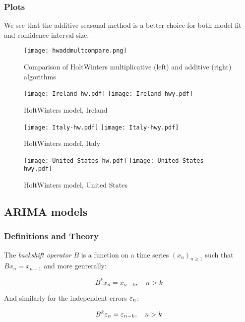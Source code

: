 \subsubsection{Plots}

We see that the additive seasonal method is a better choice for both model fit and confidence interval size.

\begin{figure}[H]
\begin{center}
\texttt{[image: hwaddmultcompare.png]}
\endminipage\hfill
\caption{Comparison of HoltWinters multiplicative (left) and additive (right) algorithms}
\end{center}
\end{figure}

\begin{figure}[H]
  \texttt{[image: Ireland-hw.pdf]} \label{fig:ireland-hw}
\endminipage\hfill
{}
  \texttt{[image: Ireland-hwy.pdf]} \label{fig:ireland-hwy}
\endminipage
\caption{HoltWinters model, Ireland}
\end{figure}

\begin{figure}[H]
  \texttt{[image: Italy-hw.pdf]} \label{fig:italy-hw}
\endminipage\hfill
{}
  \texttt{[image: Italy-hwy.pdf]} \label{fig:italy-hwy}
\endminipage
\caption{HoltWinters model, Italy}
\end{figure}

\begin{figure}[H]
  \texttt{[image: United States-hw.pdf]} \label{fig:usa-hw}
\endminipage\hfill
{}
  \texttt{[image: United States-hwy.pdf]} \label{fig:usa-hwy}
\endminipage
\caption{HoltWinters model, United States}
\end{figure}

\subsection{ARIMA models}

\subsubsection{Definitions and Theory}

\begin{definition}
The \textit{backshift operator} $B$ is a function on a time series $\left(x_n\right)_{n\geq1}$ such that $Bx_n=x_{n-1}$ and more genrerally:

$$B^k x_n= x_{n-k},\quad n>k$$

And similarly for the independent errors $\varepsilon_n$:

$$B^k \varepsilon_n= \varepsilon_{n-k},\quad n>k$$
\end{definition}

